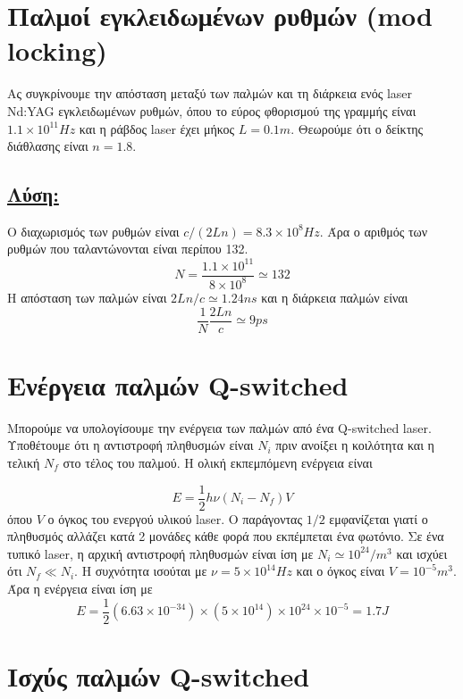\documentclass[a4paper,11pt,titlepage]{article}
\numberwithin{equation}{section} %
\begin{document}
\section{Παλμοί εγκλειδωμένων ρυθμών (mod locking)}

Ας συγκρίνουμε την απόσταση μεταξύ των παλμών και τη διάρκεια ενός laser Nd:YAG εγκλειδωμένων ρυθμών, όπου το εύρος φθορισμού της γραμμής είναι $1.1\times10^{11}Hz$ και η ράβδος laser έχει μήκος $L=0.1m$. Θεωρούμε ότι ο δείκτης διάθλασης είναι $n=1.8$.

\subsection*{\underline{Λύση:}}

Ο διαχωρισμός των ρυθμών είναι $c/(2Ln)=8.3\times10^8Hz$. Άρα ο αριθμός των ρυθμών που ταλαντώνονται είναι περίπου 132.
\begin{equation*}
 N=\dfrac{1.1\times10^{11}}{8\times10^8}\simeq132
\end{equation*}
Η απόσταση των παλμών είναι $2Ln/c\simeq1.24ns$ και η διάρκεια παλμών είναι 
\begin{equation*}
 \dfrac{1}{N}\dfrac{2Ln}{c}\simeq9ps
\end{equation*}
\newpage
\section{Ενέργεια παλμών Q-switched}

Μπορούμε να υπολογίσουμε την ενέργεια των παλμών από ένα Q-switched laser. Υποθέτουμε ότι η αντιστροφή πληθυσμών είναι $N_i$ πριν ανοίξει η κοιλότητα και η τελική $N_f$ στο τέλος του παλμού. Η ολική εκπεμπόμενη ενέργεια είναι 

\begin{equation*}
 E=\dfrac{1}{2}h\nu(N_i-N_f)V
\end{equation*}
όπου $V$ ο όγκος του ενεργού υλικού laser. Ο παράγοντας $1/2$ εμφανίζεται γιατί ο πληθυσμός αλλάζει κατά 2 μονάδες κάθε φορά που εκπέμπεται ένα φωτόνιο. Σε ένα τυπικό laser, η αρχική αντιστροφή πληθυσμών είναι ίση με $N_i\simeq10^{24}/m^3$ και ισχύει ότι $N_f\ll N_i$. Η συχνότητα ισούται με $\nu=5\times10^{14}Hz$ και ο όγκος είναι $V=10^{-5}m^3$. Άρα η ενέργεια είναι ίση με 
\begin{equation*}
 E=\dfrac{1}{2}(6.63\times10^{-34})\times(5\times10^{14})\times10^{24}\times10^{-5}=1.7J
\end{equation*}

\section{Ισχύς παλμών Q-switched}
\end{document}
